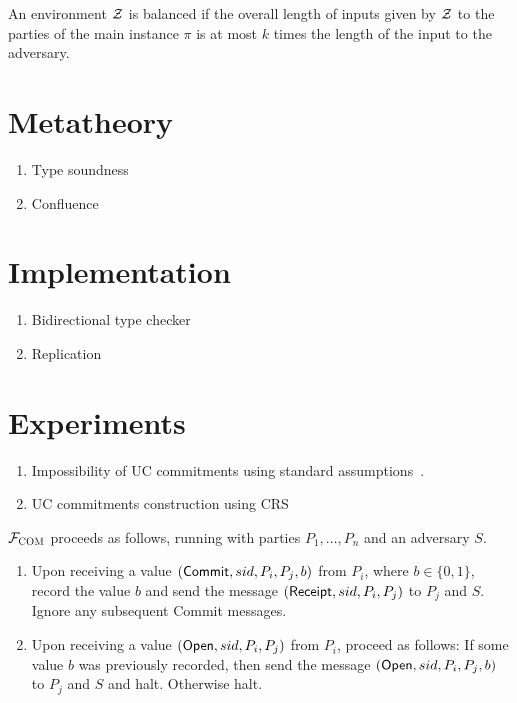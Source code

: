 \documentclass[acmsmall,review,anonymous]{acmart}\settopmatter{printfolios=true,printccs=false,printacmref=false}
\begin{document}
\begin{definition}
An environment $\mathcal{Z}$ is balanced if the overall length of inputs given by
$\mathcal{Z}$ to the parties of the main instance $\pi$ is at most $k$ times the length
of the input to the adversary.
\end{definition}


\section{Metatheory}\label{sec:metatheory}

\begin{enumerate}
\item Type soundness
\item Confluence
\end{enumerate}

\section{Implementation}\label{sec:implementation}

\begin{enumerate}
\item Bidirectional type checker
\item Replication
\end{enumerate}

\section{Experiments}\label{sec:experiments}



\begin{enumerate}
\item Impossibility of UC commitments using standard
assumptions~\cite{canetti2001commitments}.
\item UC commitments construction using CRS
\end{enumerate}

\begin{func}[COM]
    $\mathcal{F}_{\textsc{COM}}$ proceeds as follows, running with parties $P_1, \ldots, P_n$ and an adversary $S$.
    \begin{enumerate}
        \item Upon receiving a value $({\sf Commit}, sid, P_i, P_j, b)$ from
          $P_i$, where $b \in \{ 0, 1 \}$, record the value $b$ and send the
          message $({\sf Receipt}, sid, P_i, P_j)$ to $P_j$ and $S$. Ignore any
          subsequent {\sf Commit} messages.

        \item Upon receiving a value $({\sf Open}, sid, P_i, P_j)$ from $P_i$,
          proceed as follows: If some value $b$ was previously recorded, then
          send the message $({\sf Open}, sid, P_i, P_j, b)$ to $P_j$ and $S$ and halt. Otherwise halt.
    \end{enumerate}
\end{func}
\end{document}
